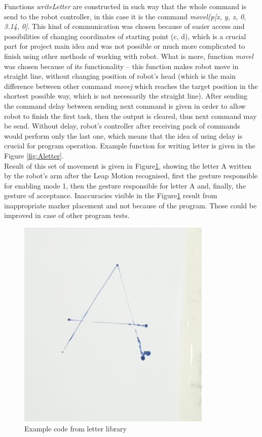 Functions \textit{writeLetter} are constructed in such way that the whole command is send to the robot controller, in this case it is the command \textit{movel(p[x, y, z, 0, 3.14, 0]}. This kind of communication was chosen because of easier access and possibilities of changing coordinates of starting point (c, d), which is a crucial part for project main idea and was not possible or much more complicated to finish using other methods of working with robot. What is more, function \textit{movel} was chosen because of its functionality – this function makes robot move in straight line, without changing position of robot’s head (which is the main difference between other command \textit{movej} which reaches the target position in the shortest possible way, which is not necessarily the straight line). After sending the command delay between sending next command is given in order to allow robot to finish the first task, then the output is cleared, thus next command may be send. Without delay, robot’s controller after receiving pack of commands would perform only the last one, which means that the idea of using delay is crucial for program operation.  Example function for writing letter is given in the Figure \ref{fig:Aletter}. \\

Result of this set of movement is given in Figure\ref{fig:letter}, showing the letter A written by the robot’s arm after the Leap Motion recognised, first the gesture responsible for enabling mode 1, then the gesture responsible for letter A and, finally, the gesture of acceptance. Inaccuracies visible in the Figure\ref{fig:letter} result from inappropriate marker placement and not because of the program. Those could be improved in case of other program tests. \\

\begin{figure}[H]
	\includegraphics{letter}
	\centering
	\caption{Example code from letter library}
	\label{fig:letter}
\end{figure}

